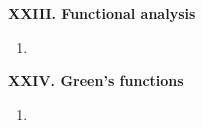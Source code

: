 \documentclass{article}
\newcommand{\<}{\left<}
\renewcommand{\>}{\right>}
\begin{document}
\begin{multicols}{3}
    \textbf{XXIII. Functional analysis}

    \begin{enumerate}[itemsep=2pt, topsep=2pt, partopsep=2pt, parsep=2pt]

        \item

    \end{enumerate}

    \textbf{XXIV. Green's functions}

    \begin{enumerate}[itemsep=2pt, topsep=2pt, partopsep=2pt, parsep=2pt]

        \item

    \end{enumerate}

\end{multicols}
\end{document}
